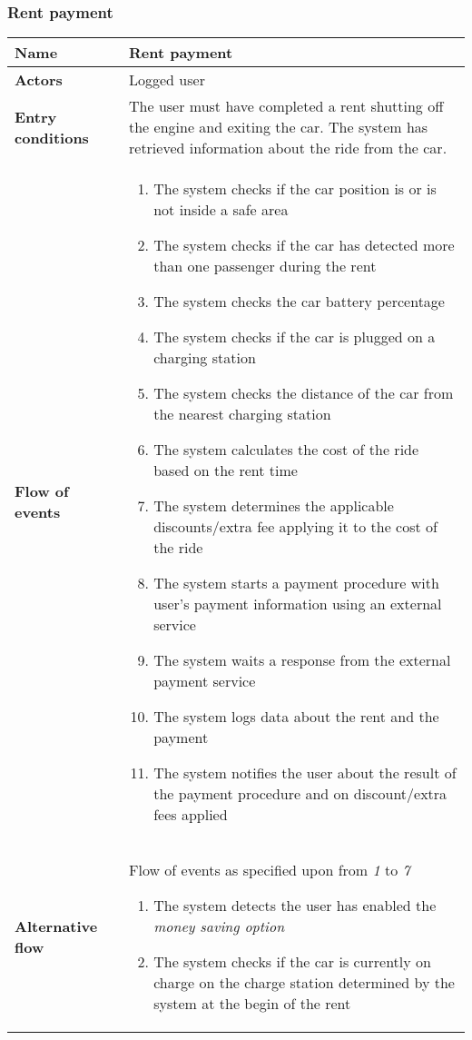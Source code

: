 \subsubsection{Rent payment}
\begin{longtable}{p{0.25\linewidth}p{0.75\linewidth}}
\toprule
\textbf{Name} & \textbf{Rent payment} \\
\midrule
\textbf{Actors} &  Logged user\\
\midrule
\textbf{Entry conditions} & 
The user must have completed a rent shutting off the engine and exiting the car. The system has retrieved information about the ride from the car. \\
\midrule
\textbf{Flow of events} & 
\begin{enumerate}
	\item The system checks if the car position is or is not inside a safe area
	\item The system checks if the car has detected more than one passenger during the rent
	\item The system checks the car battery percentage
	\item The system checks if the car is plugged on a charging station
	\item The system checks the distance of the car from the nearest charging station
	\item The system calculates the cost of the ride based on the rent time
	\item The system determines the applicable discounts/extra fee applying it to the cost of the ride
	\item The system starts a payment procedure with user's payment information using
	an external service
	\item The system waits a response from the external payment service
	\item The system logs data about the rent and the payment
    \item The system notifies the user about the result of the payment procedure and on discount/extra fees applied
\end{enumerate} \\
\midrule
\textbf{Alternative flow} & 
Flow of events as specified upon from \emph{1} to \emph{7}
\begin{enumerate}[label=8 \alph*.]
	\item The system detects the user has enabled the \emph{money saving option}
	\item The system checks if the car is currently on charge on the charge station determined by the system at the begin of the rent

\end{enumerate}
\end{longtable}
